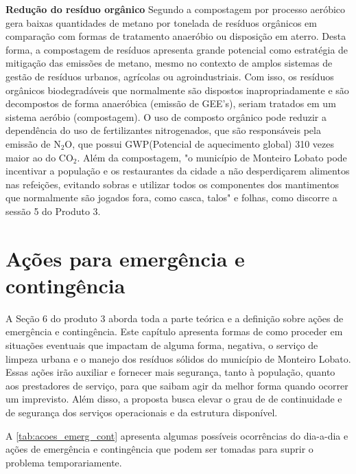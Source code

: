 \textbf{Redução do resíduo orgânico}
Segundo \cite{Inacio2010} a compostagem por processo aeróbico gera baixas quantidades de metano por tonelada de resíduos orgânicos em comparação com formas de tratamento anaeróbio ou disposição em aterro. Desta forma, a compostagem de resíduos apresenta grande potencial como estratégia de mitigação das emissões de metano, mesmo no contexto de amplos sistemas de gestão de resíduos urbanos, agrícolas ou agroindustriais.
Com isso, os resíduos orgânicos biodegradáveis que normalmente são dispostos inapropriadamente e são decompostos de forma anaeróbica (emissão de GEE’s), seriam tratados em um sistema aeróbio (compostagem). O uso de composto orgânico pode reduzir a dependência do uso de fertilizantes nitrogenados, que são responsáveis pela emissão de N$_{2}$O, que possui GWP(Potencial de aquecimento global) 310 vezes maior ao do CO$_{2}$. \cite{IPCC_2008}
Além da compostagem, "o município de Monteiro Lobato pode incentivar a população e os restaurantes da cidade a não desperdiçarem alimentos nas refeições, evitando sobras e utilizar todos os componentes dos mantimentos que normalmente são jogados fora, como casca, talos" e folhas, como discorre a sessão 5 do Produto 3.


\FloatBarrier
\newpage
\section{Ações para emergência e contingência}
\label{sec:emerg_corr}

A Seção 6 do produto 3 aborda toda a parte teórica e a definição sobre ações de emergência e contingência. Este capítulo apresenta formas de como proceder em situações eventuais que impactam de alguma forma, negativa, o serviço de limpeza urbana e o manejo dos resíduos sólidos do município de Monteiro Lobato. Essas ações irão auxiliar e fornecer mais segurança, tanto à população, quanto aos prestadores de serviço, para que saibam agir da melhor forma quando ocorrer um imprevisto. Além disso, a proposta busca elevar o grau de de continuidade e de segurança dos serviços operacionais e da estrutura disponível.

A \autoref{tab:acoes_emerg_cont} apresenta algumas possíveis ocorrências do dia-a-dia e ações de emergência e contingência que podem ser tomadas para suprir o problema temporariamente.



\newpage
